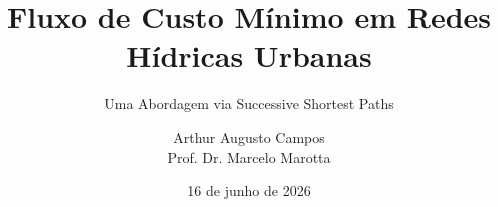\title{Fluxo de Custo Mínimo em Redes Hídricas Urbanas}
\subtitle{Uma Abordagem via Successive Shortest Paths}
\author[Arthur Augusto Campos]{Arthur Augusto Campos \\ \medskip \scriptsize Prof. Dr. Marcelo Marotta}
\date{16 de junho de 2026}
